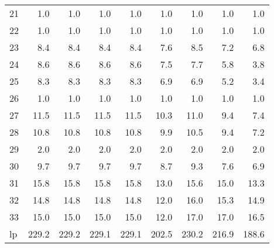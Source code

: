\begin{tabular}{lrrrrrrrr}
     21 &   1.0 &   1.0 &   1.0 &   1.0 &   1.0 &   1.0 &   1.0 &   1.0 \\
     22 &   1.0 &   1.0 &   1.0 &   1.0 &   1.0 &   1.0 &   1.0 &   1.0 \\
     23 &   8.4 &   8.4 &   8.4 &   8.4 &   7.6 &   8.5 &   7.2 &   6.8 \\
     24 &   8.6 &   8.6 &   8.6 &   8.6 &   7.5 &   7.7 &   5.8 &   3.8 \\
     25 &   8.3 &   8.3 &   8.3 &   8.3 &   6.9 &   6.9 &   5.2 &   3.4 \\
     26 &   1.0 &   1.0 &   1.0 &   1.0 &   1.0 &   1.0 &   1.0 &   1.0 \\
     27 &  11.5 &  11.5 &  11.5 &  11.5 &  10.3 &  11.0 &   9.4 &   7.4 \\
     28 &  10.8 &  10.8 &  10.8 &  10.8 &   9.9 &  10.5 &   9.4 &   7.2 \\
     29 &   2.0 &   2.0 &   2.0 &   2.0 &   2.0 &   2.0 &   2.0 &   2.0 \\
     30 &   9.7 &   9.7 &   9.7 &   9.7 &   8.7 &   9.3 &   7.6 &   6.9 \\
     31 &  15.8 &  15.8 &  15.8 &  15.8 &  13.0 &  15.6 &  15.0 &  13.3 \\
     32 &  14.8 &  14.8 &  14.8 &  14.8 &  12.0 &  16.0 &  15.3 &  14.9 \\
     33 &  15.0 &  15.0 &  15.0 &  15.0 &  12.0 &  17.0 &  17.0 &  16.5 \\
     lp & 229.2 & 229.2 & 229.1 & 229.1 & 202.5 & 230.2 & 216.9 & 188.6 \\
\bottomrule
\end{tabular}
